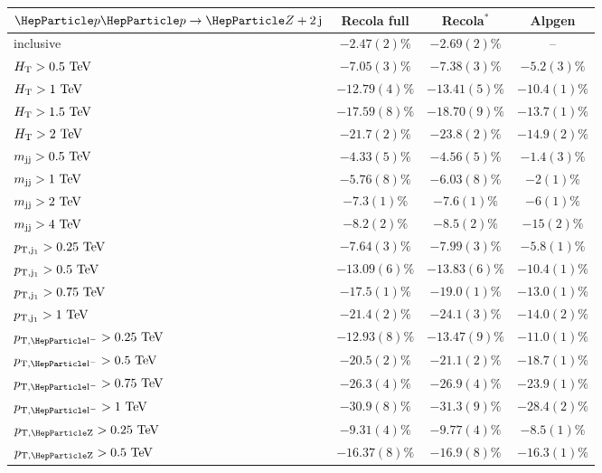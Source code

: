 \documentclass[11pt]{cernrep}
\begin{document}
\begin{table}
\centering
\small{
\begin{tabular}{l|c|c|c}
\hline
$\Pp\Pp\to\PZ+2\,\rm j$ & {\sc Recola} full & {\sc Recola}$^{*}$ & {\sc Alpgen} 
\\
\hline
\hline
inclusive  & $-2.47(2)\%$ & $-2.69(2)\%$ & -- 
\\
\hline
$H_{\rm T}>0.5~\text{TeV}$ & $-7.05(3)\%$  & $-7.38(3)\%$  & $-5.2(3)\% $    \\
$H_{\rm T}>1~\text{TeV}$   & $-12.79(4)\%$ & $-13.41(5)\%$ & $-10.4(1)\%$    \\
$H_{\rm T}>1.5~\text{TeV}$ & $-17.59(8)\%$ & $-18.70(9)\%$ & $-13.7(1)\%$    \\
$H_{\rm T}>2~\text{TeV}$   & $-21.7(2)\%$  & $-23.8(2)\%$  & $-14.9(2)\%$    \\
\hline
$m_{\rm jj}>0.5~\text{TeV}$ & $-4.33(5)\%$  & $-4.56(5)\%$ & $-1.4(3)\%$     \\
$m_{\rm jj}>1~\text{TeV}$   & $-5.76(8)\%$  & $-6.03(8)\%$ & $-2(1)\%$       \\
$m_{\rm jj}>2~\text{TeV}$   & $-7.3(1)\%$   & $-7.6(1)\%$  & $-6(1)\%$    \\
$m_{\rm jj}>4~\text{TeV}$   & $-8.2(2)\%$   & $-8.5(2)\%$  & $-15(2)\%$    \\
\hline
$p_{\rm T,j_1}>0.25~\text{TeV}$ & $-7.64(3)\%$  & $-7.99(3)\%$  & $-5.8(1)\% $    \\
$p_{\rm T,j_1}>0.5~\text{TeV}$  & $-13.09(6)\%$ & $-13.83(6)\%$ & $-10.4(1)\%$    \\
$p_{\rm T,j_1}>0.75~\text{TeV}$ & $-17.5(1)\%$  & $-19.0(1)\%$  & $-13.0(1)\%$    \\
$p_{\rm T,j_1}>1~\text{TeV}$    & $-21.4(2)\%$  & $-24.1(3)\%$  & $-14.0(2)\%$    \\
\hline
$p_{\rm T,\Pl^-}>0.25\UTeV$ & $-12.93(8)\%$ & $-13.47(9)\%$ & $-11.0(1)\%$    \\
$p_{\rm T,\Pl^-}>0.5\UTeV$  & $-20.5(2)\%$  & $-21.1(2)\%$  & $-18.7(1)\%$    \\
$p_{\rm T,\Pl^-}>0.75\UTeV$ & $-26.3(4)\%$  & $-26.9(4)\%$  & $-23.9(1)\%$    \\
$p_{\rm T,\Pl^-}>1\UTeV$    & $-30.9(8)\%$  & $-31.3(9)\%$  & $-28.4(2)\%$    \\
\hline
$p_{\rm T,\PZ}>0.25\UTeV$ & $-9.31(4)\%$   & $-9.77(4)\%$   & $ -8.5(1)\%$  \\
$p_{\rm T,\PZ}>0.5\UTeV$  & $-16.37(8)\%$  & $-16.9(8)\%$   & $-16.3(1)\%$  \\

\end{tabular}}
\end{table}
\end{document}
